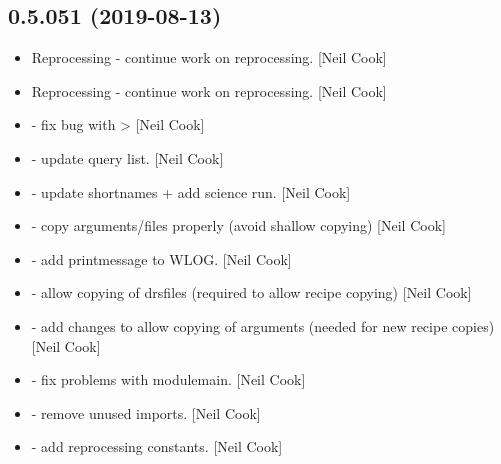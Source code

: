 \documentclass[a4paper,10pt,english]{report}
\begin{document}
\subsection{0.5.051 (2019-08-13)}
\label{\detokenize{misc/changelog:id91}}\begin{itemize}
\item {} 
Reprocessing - continue work on reprocessing. {[}Neil Cook{]}

\item {} 
Reprocessing - continue work on reprocessing. {[}Neil Cook{]}

\item {} 
 - fix bug with 
\textendash{}\textgreater{}  {[}Neil Cook{]}

\item {} 
 - update query list. {[}Neil Cook{]}

\item {} 
 - update shortnames +
add science run. {[}Neil Cook{]}

\item {} 
 - copy arguments/files properly (avoid shallow
copying) {[}Neil Cook{]}

\item {} 
 - add printmessage to WLOG. {[}Neil Cook{]}

\item {} 
 - allow copying of drsfiles (required to allow
recipe copying) {[}Neil Cook{]}

\item {} 
 - add changes to allow copying of arguments
(needed for new recipe copies) {[}Neil Cook{]}

\item {} 
 - fix problems with modulemain. {[}Neil Cook{]}

\item {} 
 - remove unused imports. {[}Neil Cook{]}

\item {} 
 - add reprocessing constants. {[}Neil Cook{]}


\end{itemize}
\end{document}
